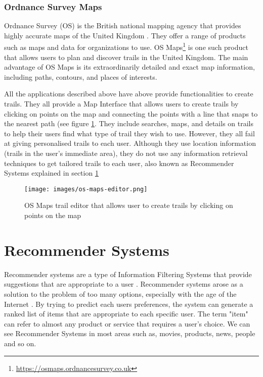 \subsubsection{Ordnance Survey Maps} 
Ordnance Survey (OS) is the British national mapping agency that provides highly accurate maps of the United Kingdom \cite{wiki:OrdinanceSurvey}.  They offer a range of products such as maps and data for organizations to use.  OS Maps\footnote{\url{https://osmaps.ordnancesurvey.co.uk}} is one such product that allows users to plan and discover trails in the United Kingdom.  The main advantage of OS Maps is its extraordinarily detailed and exact map information, including paths, contours, and places of interests.


All the applications described above have above provide functionalities to create trails. They all provide a Map Interface that allows users to create trails by clicking on points on the map and connecting the points with a line that snaps to the nearest path (see figure \ref{fig:osMapsEditor}. They include searches, maps, and details on trails to help their users find what type of trail they wish to use. However, they all fail at giving personalised trails to each user. Although they use location information (trails in the user's immediate area), they do not use any information retrieval techniques to get tailored trails to each user, also known as Recommender Systems explained in section \ref{sec:RecSystems}

\begin{figure}[ht]
    \centering
    \texttt{[image: images/os-maps-editor.png]}
    \caption{OS Maps trail editor that allows user to create trails by clicking on points on the map}
    \label{fig:osMapsEditor}
\end{figure}

\section{Recommender Systems} \label{sec:RecSystems}
Recommender systems are a type of Information Filtering Systems that provide suggestions that are appropriate to a user \cite{ricci2011introduction}.  Recommender systems arose as a solution to the problem of too many options, especially with the age of the Internet \cite{rishabh2019recommender}.  By trying to predict each users preferences, the system can generate a ranked list of items that are appropriate to each specific user.  The term "item" can refer to almost any product or service that requires a user’s choice. We can see  Recommender Systems in most areas such as,  movies,  products, news, people and so on.

